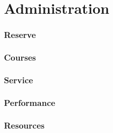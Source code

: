 \part{Administration}
\section{Reserve}

\section{Courses}

\section{Service}

\section{Performance}

\section{Resources}

%
